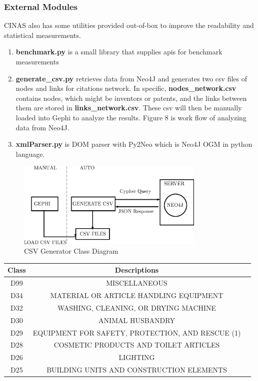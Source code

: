 \documentclass{sig-alternate}
\begin{document}
{\subsubsection{External Modules}
CINAS also has some utilities provided out-of-box to improve the readability and statistical measurements. 
\begin{enumerate}
 \item \textbf{benchmark.py} is a small library that supplies apis for benchmark measurements
 \item \textbf{generate\_csv.py} retrieves data from Neo4J and generates two csv files of nodes and links for citations network. In specific, \textbf{nodes\_network.csv} contains nodes, which might be inventors or patents, and the links between them are stored in \textbf{links\_network.csv}. These csv will then be manually loaded into Gephi to analyze the results. Figure 8 is work flow of analyzing data from Neo4J. 
 \item \textbf{xmlParser.py} is DOM parser with Py2Neo which is Neo4J OGM in python language.
\end{enumerate}
\begin{figure}[htb]
\centering
\includegraphics[width=90mm]{generate.eps}
\caption{ CSV Generator Class Diagram}
\end{figure}
\begin{table}
\begin{tabular}{|c|c|l|} \hline
 Class & Descriptions \\ \hline
D99 & MISCELLANEOUS \\ \hline
D34 & MATERIAL OR ARTICLE HANDLING EQUIPMENT\\ \hline
D32 & WASHING, CLEANING, OR DRYING MACHINE\\ \hline
D30 & ANIMAL HUSBANDRY\\ \hline
D29 & EQUIPMENT FOR SAFETY, PROTECTION, AND RESCUE (1)\\ \hline
D28 & COSMETIC PRODUCTS AND TOILET ARTICLES\\ \hline
D26 & LIGHTING\\ \hline
D25 & BUILDING UNITS AND CONSTRUCTION ELEMENTS\\ \hline

\end{tabular}
\end{table}}
\end{document}
